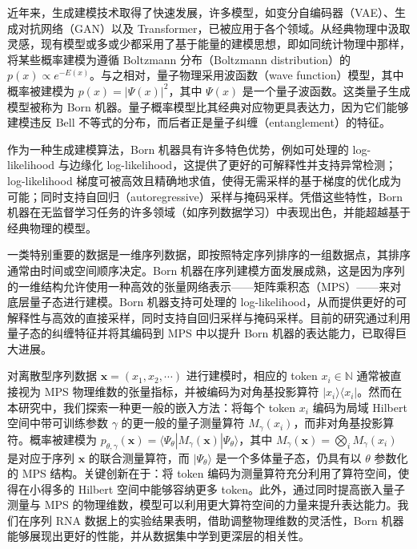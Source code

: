 \documentclass[aps,prb,twocolumn,superscriptaddress]{revtex4-2}
\newcommand{\bra}[1]{\langle #1|}
\newcommand{\ket}[1]{|#1 \rangle}
\newcommand{\dsN}{\mathbb{N}}
\newcommand{\vect}[1]{{\bm{#1}}}
\begin{document}
近年来，生成建模技术取得了快速发展，许多模型，如变分自编码器（VAE）\cite{2013arXiv1312.6114K}、生成对抗网络（GAN）\cite{2014arXiv1406.2661G,2018PhRvA..98a2324D}以及 Transformer\cite{2017arXiv170603762V}，已被应用于各个领域。从经典物理中汲取灵感，现有模型或多或少都采用了基于能量的建模思想，即如同统计物理中那样，将某些概率建模为遵循 Boltzmann 分布（Boltzmann distribution）的 $p(x)\propto e^{-E(x)}$\cite{ackley1985learning,salakhutdinov2015learning}。与之相对，量子物理采用波函数（wave function）模型，其中概率被建模为 $p(x)=|\Psi(x)|^2$，其中 $\Psi(x)$ 是一个量子波函数。这类量子生成模型被称为 Born 机器\cite{PhysRevX.8.031012, 2022PhRvA.106b2612K, 2021arXiv211205326M}。量子概率模型比其经典对应物更具表达力，因为它们能够建模违反 Bell 不等式的分布，而后者正是量子纠缠（entanglement）的特征\cite{trueblood2012quantum,haven2016quantum}。

作为一种生成建模算法，Born 机器具有许多特色优势，例如可处理的 log-likelihood 与边缘化 log-likelihood，这提供了更好的可解释性并支持异常检测；log-likelihood 梯度可被高效且精确地求值，使得无需采样的基于梯度的优化成为可能；同时支持自回归（autoregressive）采样与掩码采样。凭借这些特性，Born 机器在无监督学习任务的许多领域（如序列数据学习）中表现出色，并能超越基于经典物理的模型\cite{2018Entrp..20..583C,2018arXiv180404168L}。

一类特别重要的数据是一维序列数据，即按照特定序列排序的一组数据点，其排序通常由时间或空间顺序决定。Born 机器在序列建模方面发展成熟，这是因为序列的一维结构允许使用一种高效的张量网络表示——矩阵乘积态（MPS）——来对底层量子态进行建模\cite{orus2019tensor,2019PhRvX...9c1041L,2021arXiv210612974L}。Born 机器支持可处理的 log-likelihood，从而提供更好的可解释性与高效的直接采样，同时支持自回归采样与掩码采样。目前的研究通过利用量子态的纠缠特征并将其编码到 MPS 中以提升 Born 机器的表达能力，已取得巨大进展\cite{2018PhRvA..98a2324D,mitarai2018quantum,2018arXiv180404168L,gong2022born,2019arXiv190300556M}。

对离散型序列数据 $\vect{x}=(x_1,x_2,\cdots)$ 进行建模时，相应的 token $x_i\in \dsN$ 通常被直接视为 MPS 物理维数的张量指标，并被编码为对角基投影算符 $\ket{x_i}\bra{x_i}$。然而在本研究中，我们探索一种更一般的嵌入方法：将每个 token $x_i$ 编码为局域 Hilbert 空间中带可训练参数 $\gamma$ 的更一般的量子测量算符 $M_{\gamma}(x_i)$，而非对角基投影算符。概率被建模为 $p_{\theta,\gamma}(\vect{x})=\bra{\Psi_\theta}M_{\gamma}(\vect{x})\ket{\Psi_\theta}$，其中 $M_\gamma(\vect{x})=\bigotimes_i M_\gamma(x_i)$ 是对应于序列 $\vect{x}$ 的联合测量算符，而 $\ket{\Psi_\theta}$ 是一个多体量子态，仍具有以 $\theta$ 参数化的 MPS 结构。关键创新在于：将 token 编码为测量算符充分利用了算符空间，使得在小得多的 Hilbert 空间中能够容纳更多 token。此外，通过同时提高嵌入量子测量与 MPS 的物理维数，模型可以利用更大算符空间的力量来提升表达能力。我们在序列 RNA 数据上的实验结果表明，借助调整物理维数的灵活性，Born 机器能够展现出更好的性能，并从数据集中学到更深层的相关性。
\end{document}
